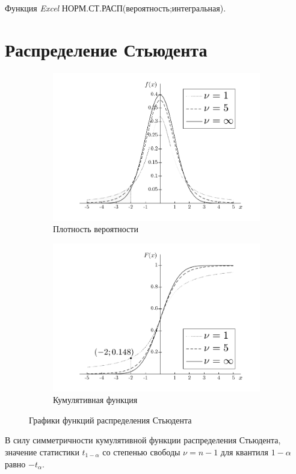\documentclass[12pt,a4paper]{article}
\begin{document}
Функция \textit{Excel} НОРМ.СТ.РАСП(вероятность;интегральная).
\normalsize
\pagebreak
\section{Распределение Стьюдента}
\begin{figure}[H]
\centering
	\begin{subfigure}[t]{7cm}
		\centering
		\includegraphics[scale=0.5]{img/student_pdf.png}
		\caption{Плотность вероятности}
\label{fig:a_normal_pdf}	
	\end{subfigure}
	\begin{subfigure}[t]{5cm}
		\centering
		\includegraphics[scale=0.5]{img/student_cdf.png}
		\caption{Кумулятивная функция}
\label{fig:b_normal_cdf}
	\end{subfigure}
	\caption{Графики функций распределения Стьюдента}\label{fig:df_and_cdf}
\end{figure}
В силу симметричности кумулятивной функции распределения Стьюдента, значение статистики $t_{1-\alpha}$ со степенью свободы $\nu=n-1$ для квантиля $1-\alpha$ равно $-t_{\alpha}$.
\end{document}
